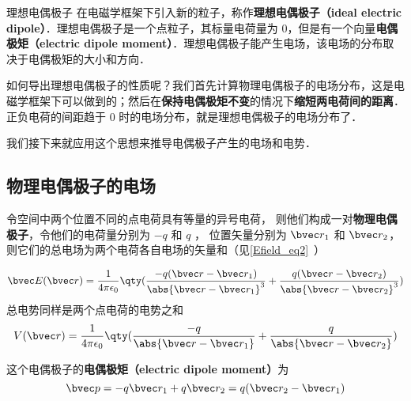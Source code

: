 \begin{definition}{理想电偶极子}
在电磁学框架下引入新的粒子，称作\textbf{理想电偶极子（ideal electric dipole）}．理想电偶极子是一个点粒子，其标量电荷量为 $0$，但是有一个向量\textbf{电偶极矩（electric dipole moment）}．理想电偶极子能产生电场，该电场的分布取决于电偶极矩的大小和方向．
\end{definition}


如何导出理想电偶极子的性质呢？我们首先计算物理电偶极子的电场分布，这是电磁学框架下可以做到的；然后在\textbf{保持电偶极矩不变}的情况下\textbf{缩短两电荷间的距离}．正负电荷的间距趋于 $0$ 时的电场分布，就是理想电偶极子的电场分布了．

我们接下来就应用这个思想来推导电偶极子产生的电场和电势．


\subsection{物理电偶极子的电场}

令空间中两个位置不同的点电荷具有等量的异号电荷， 则他们构成一对\textbf{物理电偶极子}，令他们的电荷量分别为 $-q$ 和 $q$ ， 位置矢量分别为 $\bvec r_1$ 和 $\bvec r_2$， 则它们的总电场为两个电荷各自电场的矢量和（见\autoref{Efield_eq2}~）

\begin{equation}
\bvec E(\bvec r) = \frac{1}{4\pi\epsilon_0} \qty(\frac{-q(\bvec r - \bvec r_1)}{\abs{\bvec r - \bvec r_1}^3} + \frac{q(\bvec r - \bvec r_2)}{\abs{\bvec r - \bvec r_2}^3})
\end{equation}
总电势同样是两个点电荷的电势之和%
\begin{equation}\label{eleDpl_eq4}
V(\bvec r) = \frac{1}{4\pi\epsilon_0} \qty(\frac{-q}{\abs{\bvec r - \bvec r_1}} + \frac{q}{\abs{\bvec r - \bvec r_2}})
\end{equation}


这个电偶极子的\textbf{电偶极矩（electric dipole moment）}为
\begin{equation}\label{eleDpl_eq1}
\bvec p = -q \bvec r_1 + q \bvec r_2 = q (\bvec r_2 - \bvec r_1)
\end{equation} 


